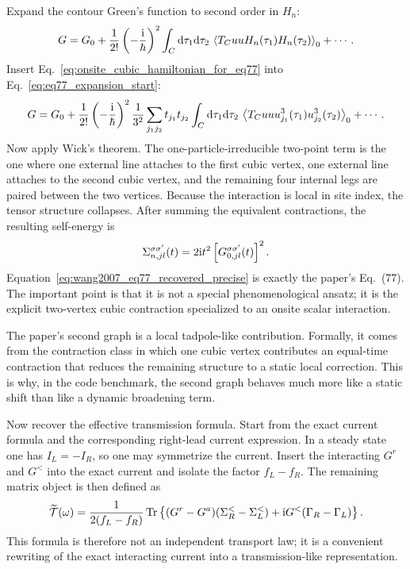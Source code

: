 Expand the contour Green's function to second order in $H_n$:
\begin{equation}
    G = G_0 + \frac{1}{2!}\left( -\frac{\mathrm{i}}{\hbar} \right)^2\int_C \mathrm{d}\tau_1\mathrm{d}\tau_2\,\left\langle T_C u u H_n(\tau_1)H_n(\tau_2) \right\rangle_0 + \cdots.
    \label{eq:eq77_expansion_start}
\end{equation}
Insert Eq.~\eqref{eq:onsite_cubic_hamiltonian_for_eq77} into Eq.~\eqref{eq:eq77_expansion_start}:
\begin{align}
    G
    =
    G_0
    + \frac{1}{2!}\left( -\frac{\mathrm{i}}{\hbar} \right)^2
      \frac{1}{3^2}
      \sum_{j_1 j_2}t_{j_1}t_{j_2}
      \int_C \mathrm{d}\tau_1\mathrm{d}\tau_2\,
      \left\langle T_C u u u_{j_1}^3(\tau_1)u_{j_2}^3(\tau_2) \right\rangle_0
    + \cdots.
    \label{eq:eq77_expansion_after_insertion}
\end{align}
Now apply Wick's theorem. The one-particle-irreducible two-point term is the one where one external line attaches to the first cubic vertex, one external line attaches to the second cubic vertex, and the remaining four internal legs are paired between the two vertices. Because the interaction is local in site index, the tensor structure collapses. After summing the equivalent contractions, the resulting self-energy is
\begin{equation}
    \Sigma_{n,jl}^{\sigma\sigma'}(t) = 2\mathrm{i} t^2\left[ G_{0,jl}^{\sigma\sigma'}(t) \right]^2.
    \label{eq:wang2007_eq77_recovered_precise}
\end{equation}
Equation~\eqref{eq:wang2007_eq77_recovered_precise} is exactly the paper's Eq.~(77). The important point is that it is not a special phenomenological ansatz; it is the explicit two-vertex cubic contraction specialized to an onsite scalar interaction.

The paper's second graph is a local tadpole-like contribution. Formally, it comes from the contraction class in which one cubic vertex contributes an equal-time contraction that reduces the remaining structure to a static local correction. This is why, in the code benchmark, the second graph behaves much more like a static shift than like a dynamic broadening term.

Now recover the effective transmission formula. Start from the exact current formula and the corresponding right-lead current expression. In a steady state one has $I_L = -I_R$, so one may symmetrize the current. Insert the interacting $G^r$ and $G^<$ into the exact current and isolate the factor $f_L-f_R$. The remaining matrix object is then defined as
\begin{equation}
    \widetilde{\mathcal T}(\omega)
    =
    \frac{1}{2(f_L-f_R)}
    \operatorname{Tr}\left\{ (G^r-G^a)(\Sigma_R^< - \Sigma_L^<) + \mathrm{i} G^<(\Gamma_R-\Gamma_L) \right\}.
    \label{eq:wang2007_effective_transmission_recovered_full}
\end{equation}
This formula is therefore not an independent transport law; it is a convenient rewriting of the exact interacting current into a transmission-like representation.

